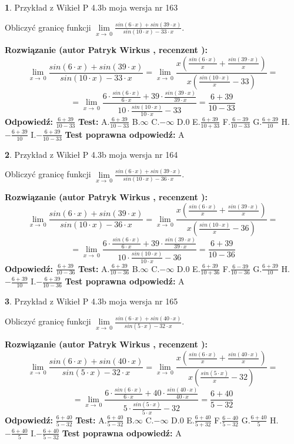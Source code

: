 \documentclass[12pt, a4paper]{article}
\theoremstyle{definition} %
\newtheorem{zad}{}
\newcommand{\zadStart}[1]{\begin{zad}#1\newline}
\newcommand{\zadStop}{\end{zad}}
\newcommand{\rozwStart}[2]{\noindent \textbf{Rozwiązanie (autor #1 , recenzent #2): }\newline}
\newcommand{\rozwStop}{\newline}
\newcommand{\odpStart}{\noindent \textbf{Odpowiedź:}\newline}
\newcommand{\odpStop}{\newline}
\newcommand{\testStart}{\noindent \textbf{Test:}\newline}
\newcommand{\testStop}{\newline}
\newcommand{\kluczStart}{\noindent \textbf{Test poprawna odpowiedź:}\newline}
\newcommand{\kluczStop}{\newline}
\begin{document}
\zadStart{Przykład z Wikieł P 4.3b moja wersja nr 163}


Obliczyć granicę funkcji $\lim\limits_{x\to\ 0}\frac{sin(6 \cdot x)+sin(39 \cdot x)}{sin(10 \cdot x)-33 \cdot x}$.
\zadStop
\rozwStart{Patryk Wirkus}{}
$$\lim\limits_{x\to\ 0}\frac{sin(6 \cdot x)+sin(39 \cdot x)}{sin(10 \cdot x)-33 \cdot x}=\lim\limits_{x\to\ 0}\frac{x(\frac{sin(6 \cdot x)}{x}+\frac{sin(39 \cdot x)}{x})}{x(\frac{sin(10 \cdot x)}{x}-33)}=$$
$$=\lim\limits_{x\to\ 0}\frac{6 \cdot \frac{sin(6 \cdot x)}{6 \cdot x}+39 \cdot \frac{sin(39 \cdot x)}{39 \cdot x}}{10 \cdot \frac{sin(10 \cdot x)}{10 \cdot x}-33}=\frac{6+39}{10-33}$$
\rozwStop
\odpStart
$\frac{6+39}{10-33}$
\odpStop
\testStart
A.$\frac{6+39}{10-33}$
B.$\infty$
C.$-\infty$
D.$0$
E.$\frac{6+39}{10+33}$
F.$\frac{6-39}{10-33}$
G.$\frac{6+39}{10}$
H.$-\frac{6+39}{10}$
I.$-\frac{6+39}{10-33}$
\testStop
\kluczStart
A
\kluczStop



\zadStart{Przykład z Wikieł P 4.3b moja wersja nr 164}


Obliczyć granicę funkcji $\lim\limits_{x\to\ 0}\frac{sin(6 \cdot x)+sin(39 \cdot x)}{sin(10 \cdot x)-36 \cdot x}$.
\zadStop
\rozwStart{Patryk Wirkus}{}
$$\lim\limits_{x\to\ 0}\frac{sin(6 \cdot x)+sin(39 \cdot x)}{sin(10 \cdot x)-36 \cdot x}=\lim\limits_{x\to\ 0}\frac{x(\frac{sin(6 \cdot x)}{x}+\frac{sin(39 \cdot x)}{x})}{x(\frac{sin(10 \cdot x)}{x}-36)}=$$
$$=\lim\limits_{x\to\ 0}\frac{6 \cdot \frac{sin(6 \cdot x)}{6 \cdot x}+39 \cdot \frac{sin(39 \cdot x)}{39 \cdot x}}{10 \cdot \frac{sin(10 \cdot x)}{10 \cdot x}-36}=\frac{6+39}{10-36}$$
\rozwStop
\odpStart
$\frac{6+39}{10-36}$
\odpStop
\testStart
A.$\frac{6+39}{10-36}$
B.$\infty$
C.$-\infty$
D.$0$
E.$\frac{6+39}{10+36}$
F.$\frac{6-39}{10-36}$
G.$\frac{6+39}{10}$
H.$-\frac{6+39}{10}$
I.$-\frac{6+39}{10-36}$
\testStop
\kluczStart
A
\kluczStop



\zadStart{Przykład z Wikieł P 4.3b moja wersja nr 165}


Obliczyć granicę funkcji $\lim\limits_{x\to\ 0}\frac{sin(6 \cdot x)+sin(40 \cdot x)}{sin(5 \cdot x)-32 \cdot x}$.
\zadStop
\rozwStart{Patryk Wirkus}{}
$$\lim\limits_{x\to\ 0}\frac{sin(6 \cdot x)+sin(40 \cdot x)}{sin(5 \cdot x)-32 \cdot x}=\lim\limits_{x\to\ 0}\frac{x(\frac{sin(6 \cdot x)}{x}+\frac{sin(40 \cdot x)}{x})}{x(\frac{sin(5 \cdot x)}{x}-32)}=$$
$$=\lim\limits_{x\to\ 0}\frac{6 \cdot \frac{sin(6 \cdot x)}{6 \cdot x}+40 \cdot \frac{sin(40 \cdot x)}{40 \cdot x}}{5 \cdot \frac{sin(5 \cdot x)}{5 \cdot x}-32}=\frac{6+40}{5-32}$$
\rozwStop
\odpStart
$\frac{6+40}{5-32}$
\odpStop
\testStart
A.$\frac{6+40}{5-32}$
B.$\infty$
C.$-\infty$
D.$0$
E.$\frac{6+40}{5+32}$
F.$\frac{6-40}{5-32}$
G.$\frac{6+40}{5}$
H.$-\frac{6+40}{5}$
I.$-\frac{6+40}{5-32}$
\testStop
\kluczStart
A
\kluczStop
\end{document}

